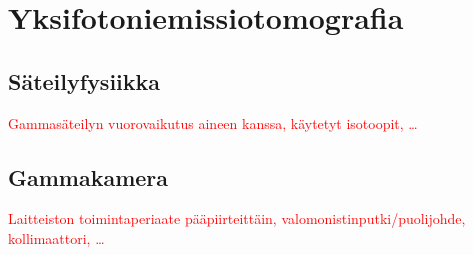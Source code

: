 \section{Yksifotoniemissiotomografia}
\subsection{Säteilyfysiikka}
\textcolor{red}{Gammasäteilyn vuorovaikutus aineen kanssa, käytetyt isotoopit, \dots}
\subsection{Gammakamera}
\textcolor{red}{Laitteiston toimintaperiaate pääpiirteittäin, valomonistinputki/puolijohde, kollimaattori, \dots}
